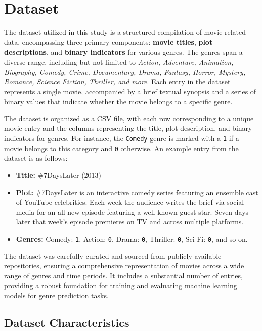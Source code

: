 \documentclass[conference]{IEEEtran}
\begin{document}
\section{Dataset}

The dataset utilized in this study is a structured compilation of movie-related data, encompassing three primary components: \textbf{movie titles}, \textbf{plot descriptions}, and \textbf{binary indicators} for various genres. The genres span a diverse range, including but not limited to \textit{Action, Adventure, Animation, Biography, Comedy, Crime, Documentary, Drama, Fantasy, Horror, Mystery, Romance, Science Fiction, Thriller, and more}. Each entry in the dataset represents a single movie, accompanied by a brief textual synopsis and a series of binary values that indicate whether the movie belongs to a specific genre. 

The dataset is organized as a CSV file, with each row corresponding to a unique movie entry and the columns representing the title, plot description, and binary indicators for genres. For instance, the \texttt{Comedy} genre is marked with a \texttt{1} if a movie belongs to this category and \texttt{0} otherwise. An example entry from the dataset is as follows:

\begin{itemize}
    \item \textbf{Title:} \#7DaysLater (2013)
    \item \textbf{Plot:} \#7DaysLater is an interactive comedy series featuring an ensemble cast of YouTube celebrities. Each week the audience writes the brief via social media for an all-new episode featuring a well-known guest-star. Seven days later that week's episode premieres on TV and across multiple platforms.
    \item \textbf{Genres:} Comedy: \texttt{1}, Action: \texttt{0}, Drama: \texttt{0}, Thriller: \texttt{0}, Sci-Fi: \texttt{0}, and so on.
\end{itemize}

The dataset was carefully curated and sourced from publicly available repositories, ensuring a comprehensive representation of movies across a wide range of genres and time periods. It includes a substantial number of entries, providing a robust foundation for training and evaluating machine learning models for genre prediction tasks.

\subsection{Dataset Characteristics}
\end{document}
